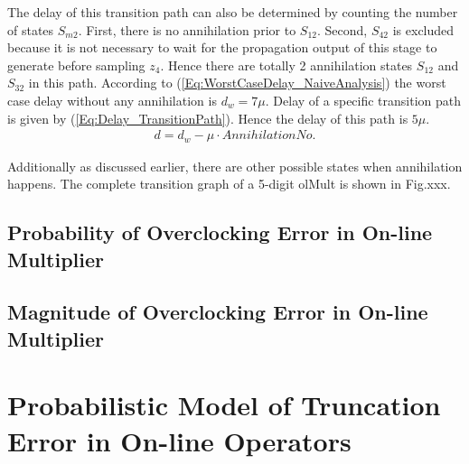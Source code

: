 \documentclass[a4paper, 11pt]{article}
\begin{document}
The delay of this transition path can also be determined by counting the number of states $S_{m2}$. First, there is no annihilation prior to $S_{12}$. Second, $S_{42}$ is excluded because it is not necessary to wait for the propagation output of this stage to generate before sampling $z_4$. Hence there are totally 2 annihilation states $S_{12}$ and $S_{32}$ in this path. According to (\ref{Eq:WorstCaseDelay_NaiveAnalysis}) the worst case delay without any annihilation is $d_w=7\mu$. Delay of a specific transition path is given by (\ref{Eq:Delay_TransitionPath}). Hence the delay of this path is $5\mu$.
%
\begin{eqnarray}\label{Eq:Delay_TransitionPath}
  d = d_w - \mu\cdot AnnihilationNo.  
\end{eqnarray}

Additionally as discussed earlier, there are other possible states when annihilation happens. The complete transition graph of a 5-digit olMult is shown in Fig.xxx.



 


%
%


\subsection{Probability of Overclocking Error in On-line Multiplier}

\subsection{Magnitude of Overclocking Error in On-line Multiplier}

\section{Probabilistic Model of Truncation Error in On-line Operators}
\end{document}
